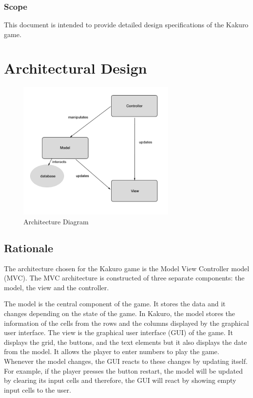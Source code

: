 \documentclass[12pt]{article}
\begin{document}
\subsubsection{Scope}
This document is intended to provide detailed design specifications of the Kakuro game.

\newpage

\section{Architectural Design} \label{sec:arch}




\begin{figure}[htbp]
    \includegraphics[width=0.7\textwidth]{archi_diagram}
    \caption{Architecture Diagram}
    \label{fig:archi_diagram}
\end{figure}

\subsection{Rationale}

The architecture chosen for the Kakuro game is the Model View Controller model (MVC). The MVC architecture is constructed of three separate components: the model, the view and the controller. \newline

The model is the central component of the game. It stores the data and it changes depending on the state of the game. In Kakuro, the model stores the information of the cells from the rows and the columns displayed by the graphical user interface. The view is the graphical user interface (GUI) of the game. It displays the grid, the buttons, and the text elements but it also displays the date from the model. It allows the player to enter numbers to play the game. Whenever the model changes, the GUI reacts to these changes by updating itself. For example, if the player presses the button restart, the model will be updated by clearing its input cells and therefore, the GUI will react by showing empty input cells to the user.\newline
\end{document}
